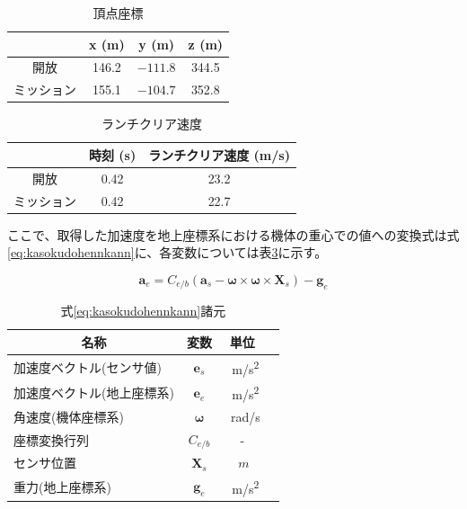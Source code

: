 \documentclass[a4paper,11pt,uplatex]{jsarticle}
\begin{document}
\begin{table}[H]
	\centering
	\caption{頂点座標}
	\label{tab:tyouten_kiban}
	\begin{tabular}{cccc}
		\toprule
		      & x (\si{m}) & y (\si{m}) & z (\si{m}) \\\midrule
		開放    & 146.2      & $-111.8$   & 344.5      \\
		ミッション & 155.1      & $-104.7$   & 352.8      \\
		\bottomrule
	\end{tabular}
\end{table}

\begin{table}[H]
	\centering
	\caption{ランチクリア速度}
	\label{tab:launch_sokudo}
	\begin{tabular}{ccc}
		\toprule
		      & 時刻 (\si{s}) & ランチクリア速度 (\si{m/s}) \\
		\midrule
		開放    & 0.42        & 23.2                \\
		ミッション & 0.42        & 22.7                \\
		\bottomrule
	\end{tabular}
\end{table}

ここで、取得した加速度を地上座標系における機体の重心での値への変換式は式\eqref{eq:kasokudohennkann}に、各変数については表\ref{tab:henkan_keisu}に示す。

\begin{equation}
	\bm{a}_e = C_{e/b}\left(\bm{a}_s-\bm{\omega}\times \bm{\omega}\times \bm{X}_s\right)-\bm{g}_e
	\label{eq:kasokudohennkann}
\end{equation}

\begin{table}[H]
	\centering
	\caption{式\eqref{eq:kasokudohennkann}諸元}
	\label{tab:henkan_keisu}
	\begin{tabular}{lccr}
		\toprule
		\multicolumn{1}{c}{名称} & 変数            & 単位           \\
		\midrule
		加速度ベクトル(センサ値)          & $\bm{e}_s$    & \SI{}{m/s^2} \\
		加速度ベクトル(地上座標系)         & $\bm{e}_e$    & \SI{}{m/s^2} \\
		角速度(機体座標系)             & $\bm{\omega}$ & \SI{}{rad/s} \\
		座標変換行列                 & $C_{e/b}$     & -            \\
		センサ位置                  & $\bm{X}_s$    & $\SI{}{m}$   \\
		重力(地上座標系)              & $\bm{g}_e$    & \SI{}{m/s^2} \\
		\bottomrule
	\end{tabular}
\end{table}
\end{document}
